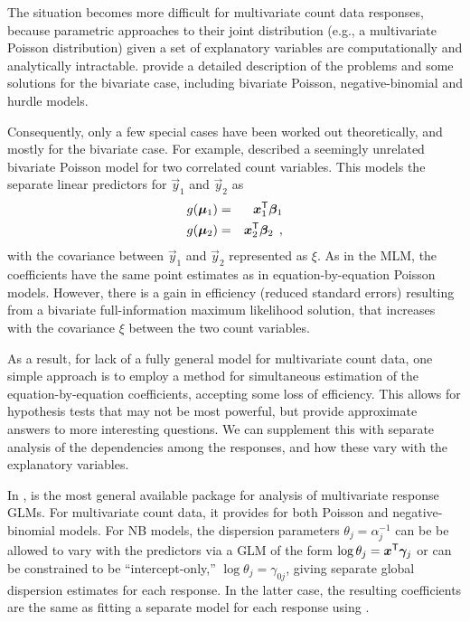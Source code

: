 \documentclass[11pt]{book}\usepackage[]{graphicx}\usepackage[]{color}
\begin{document}
The situation becomes more difficult for multivariate count data responses, because parametric approaches to
their joint distribution (e.g., a multivariate Poisson distribution)
given a set of explanatory variables are computationally and analytically intractable.
\citet[]{CameronTrivedi:2013} provide a detailed description of the problems and some solutions for
the bivariate case, including bivariate Poisson, negative-binomial and hurdle models.

Consequently, only a few special cases have been worked out theoretically, and mostly for the
bivariate case. For example, \cite{King:1989} described a seemingly unrelated bivariate Poisson model
for two correlated count variables. This models the separate linear predictors for $\vec{y}_1$ and
$\vec{y}_2$ as
\begin{eqnarray*}
g(\bm{\mu}_1) & = & \bm{x}_1 ^\mathsf{T} \bm{\beta}_1 \\
g(\bm{\mu}_2) & = & \bm{x}_2 ^\mathsf{T} \bm{\beta}_2       \:\: ,
\end{eqnarray*}
with the covariance between $\vec{y}_1$ and
$\vec{y}_2$ represented as $\xi$. As in the MLM, the coefficients have the same point estimates as
in equation-by-equation Poisson models.  However, there is a gain in efficiency (reduced standard errors)
resulting from a bivariate full-information maximum likelihood solution, that increases with the
covariance $\xi$ between the two count variables.

As a result, for lack of a fully general model for multivariate count data, one simple approach is to
employ a method for simultaneous estimation of the equation-by-equation coefficients, accepting some loss
of efficiency. This allows for hypothesis tests that may not be most powerful, but provide 
approximate answers to more interesting questions.  We can supplement this with separate analysis
of the dependencies among the responses, and how these vary with the explanatory variables.

In \R,  is the most general available package for analysis of multivariate response GLMs.
For multivariate count data, it provides for both Poisson and negative-binomial models.  For NB
models, the dispersion parameters $\theta_j = \alpha_j^{-1}$ can be be allowed to vary with the
predictors via a GLM  of the form
$\log \theta_j = \bm{x}^\mathsf{T} \bm{\gamma}_j$
or can be constrained to be ``intercept-only,''
$\log \theta_j = \gamma_{0j}$,
giving separate global dispersion estimates for each response.
In the latter case, the resulting coefficients are the same as fitting a separate model for
each response using .
\end{document}
